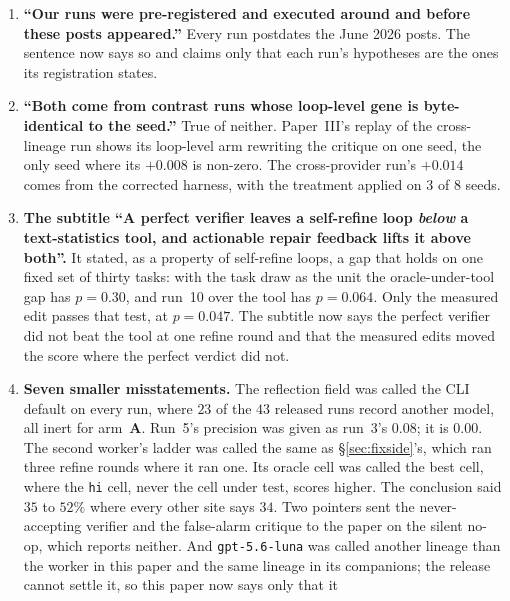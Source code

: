 \documentclass[11pt]{article}
\begin{document}
\begin{enumerate}
    detector with actionable repair text. DeCRIM reports an oracle critic paying over a deeper
    budget, and the evolved-verifier paper reports one cell at $p_0 = 0.267$ (entry~53). Both sentences now
    carry the scope, and the related work cites the results on the other side.
  \item \textbf{``Our runs were pre-registered and executed around and before these posts
    appeared.''} Every run postdates the June 2026 posts. The sentence now says so and claims
    only that each run's hypotheses are the ones its registration states.
  \item \textbf{``Both come from contrast runs whose loop-level gene is byte-identical to the
    seed.''} True of neither. Paper~III's replay of the cross-lineage run shows its loop-level arm
    rewriting the critique on one seed, the only seed where its $+0.008$ is non-zero. The
    cross-provider run's $+0.014$ comes from the corrected harness, with the treatment applied on
    $3$ of $8$ seeds.
  \item \textbf{The subtitle ``A perfect verifier leaves a self-refine loop \emph{below} a
    text-statistics tool, and actionable repair feedback lifts it above both''.} It stated, as a
    property of self-refine loops, a gap that holds on one fixed set of thirty tasks: with the
    task draw as the unit the oracle-under-tool gap has $p = 0.30$, and run~10 over the tool has
    $p = 0.064$. Only the measured edit passes that test, at $p = 0.047$. The subtitle now says the
    perfect verifier did not beat the tool at one refine round and that the measured edits moved
    the score where the perfect verdict did not.
  \item \textbf{Seven smaller misstatements.} The reflection field was called the CLI default on
    every run, where $23$ of the $43$ released runs record another model, all inert for
    arm~\textbf{A}. Run~5's precision
    was given as run~3's $0.08$; it is $0.00$. The second worker's ladder was called the same as
    \S\ref{sec:fixside}'s, which ran three refine rounds where it ran one. Its oracle cell was
    called the best cell, where the \texttt{hi} cell, never the cell under test, scores higher. The conclusion
    said $35$ to $52\%$ where every other site says $34$. Two pointers sent the never-accepting
    verifier and the false-alarm critique to the paper on the silent no-op, which reports neither.
    And \texttt{gpt-5.6-luna} was called another lineage than the worker in this paper and the same
    lineage in its companions; the release cannot settle it, so this paper now says only that it

\end{enumerate}
\end{document}
